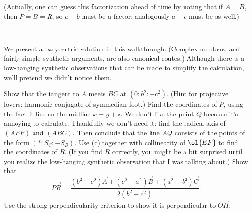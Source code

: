 (Actually, one can guess this factorization ahead of time
by noting that if $A=B$, then $P=B=R$, so $a-b$ must be a factor;
analogously $a-c$ must be as well.)

---

We present a barycentric solution in this walkthrough.
(Complex numbers, and fairly simple synthetic arguments,
are also canonical routes.)
Although there is a low-hanging synthetic observations
that can be made to simplify the calculation,
we'll pretend we didn't notice them.
\begin{walk}
  \ii Show that the tangent to $A$ meets $BC$ at $(0 : b^2 : -c^2)$.
  (Hint for projective lovers: harmonic conjugate of symmedian foot.)
  \ii Find the coordinates of $P$,
  using the fact it lies on the midline $x = y+z$.
  \ii We don't like the point $Q$ because it's annoying to calculate.
  Thankfully we don't need it:
  find the radical axis of $(AEF)$ and $(ABC)$.
  Then conclude that the line $AQ$ consists
  of the points of the form $({\ast} : S_C : -S_B)$.
  \ii Use (c) together with collinearity of $\ol{EF}$
  to find the coordinates of $R$.
  (If you find $R$ correctly, you might be a bit surprised
  until you realize the low-hanging synthetic observation
  that I was talking about.)
  \ii Show that
  \[ \overrightarrow{PR} = \frac{(b^2-c^2) \vec A
    + (c^2-a^2) \vec B + (a^2-b^2) \vec C}{2(b^2-c^2)}. \]
  \ii Use the strong perpendicularity criterion
  to show it is perpendicular to $\overrightarrow{OH}$.
\end{walk}
